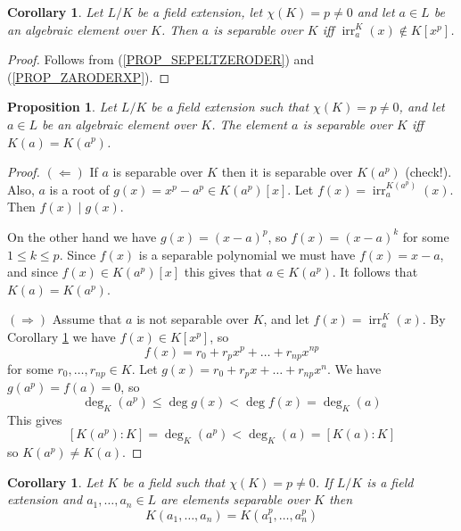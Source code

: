 \documentclass[12pt, letterpaper, oneside]{article}
\theoremstyle{plain}
\newtheorem{proposition}[theorem]{Proposition}
\newtheorem{corollary}[theorem]{Corollary}
\theoremstyle{definition}
\newcommand{\irr}{\operatorname{irr}}
\newcommand{\vs}{\vskip 5mm}
\begin{document}
\vs\vs

\begin{corollary}
\label{COR_SEPELTAXPPOLY}
Let $L/K$ be a field extension, let $\chi(K) = p \neq 0$ and let $a\in L$ be an 
algebraic element over $K$. Then $a$ is separable over $K$ iff $\irr^{K}_{a}(x)\not\in K[x^{p}]$.
\end{corollary}


\vs

\begin{proof}
Follows from (\ref{PROP_SEPELTZERODER}) and (\ref{PROP_ZARODERXP}).
\end{proof}



\vs\vs


\begin{proposition}
\label{PROP_SEPKAIAKAP}
Let $L/K$ be a field extension  such that $\chi(K) = p \neq 0$, and let $a\in L$ be 
an algebraic element over $K$. The element $a$ is separable over $K$ iff 
$K(a) = K(a^{p})$. 
\end{proposition}


\vs 

\begin{proof}
$(\Leftarrow)$ If $a$ is separable over $K$ then it is separable over $K(a^{p})$ (check!). 
Also, $a$ is a root of $g(x)= x^{p}-a^{p}\in K(a^{p})[x]$. Let $f(x) = \irr^{K(a^{p})}_{a}(x)$. 
Then $f(x)\mid g(x)$. 

On the other hand we have $g(x) = (x-a)^{p}$, so $f(x) = (x-a)^{k}$
for some $1\leq k \leq p$. Since $f(x)$ is a separable polynomial we must have $f(x) = x-a$, 
and since $f(x)\in K(a^{p})[x]$ this gives that $a\in K(a^{p})$. It follows that $K(a) = K(a^{p})$.


\vs 


$(\Rightarrow)$ Assume that $a$ is not separable over $K$, and let $f(x)= \irr^{K}_{a}(x)$. 
By Corollary \ref{COR_SEPELTAXPPOLY} we have $f(x)\in K[x^{p}]$, so
$$f(x) = r_{0} + r_{p}x^{p} + {\dots} + r_{np}x^{np}$$
for some $r_{0}, \dots, r_{np}\in K$. Let $g(x) = r_{0} + r_{p}x + {\dots} + r_{np}x^{n}$. 
We have $g(a^{p}) = f(a) = 0$, so 
$$\deg_{K}(a^{p}) \leq \deg g(x) < \deg f(x) = \deg_{K}(a)$$
This gives 
$$[K(a^{p}): K ] = \deg_{K} (a^{p}) < \deg_{K}(a) = [K(a): K]$$
so $K(a^{p})\neq K(a)$.
\end{proof}

\vs\vs

\begin{corollary}
\label{COR_SEPKAIAKAP}
Let $K$ be a field such that $\chi(K)=p\neq 0$. If $L/K$ is a field extension 
and $a_{1}, \dots, a_{n}\in L$ are elements separable over $K$ then
$$K(a_{1}, \dots, a_{n}) = K(a_{1}^{p}, \dots, a_{n}^{p})$$
\end{corollary}
\end{document}
